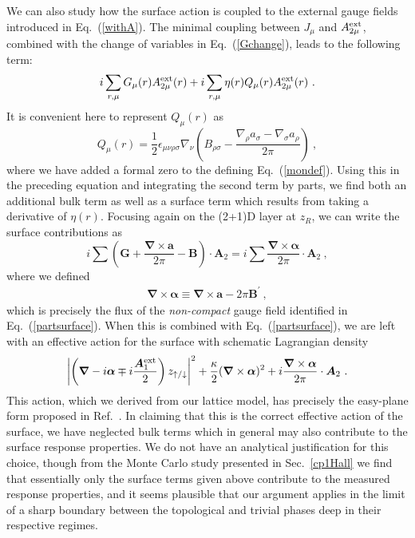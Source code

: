 We can also study how the surface action is coupled to the external gauge fields introduced in Eq.~(\ref{withA}). The minimal coupling between $J_\mu$ and $A^{\rm ext}_{2\mu}$, combined with the change of variables in Eq.~(\ref{Gchange}), leads to the following term:
\begin{equation}
i \sum_{r,\mu} G_\mu(r) A^{\rm ext}_{2\mu}(r) + i \sum_{r,\mu} \eta(r) Q_\mu(r) A^{\rm ext}_{2\mu}(r) ~.
\end{equation}
It is convenient here to represent $Q_\mu(r)$ as
\begin{equation}
Q_\mu(r) = \frac{1}{2} \epsilon_{\mu\nu\rho\sigma} \nabla_\nu 
\left(B_{\rho\sigma} - \frac{\nabla_\rho a_\sigma - \nabla_\sigma a_\rho}{2\pi} \right) ~,
\end{equation}
where we have added a formal zero to the defining Eq.~(\ref{mondef}).
Using this in the preceding equation and integrating the second term by parts, we find both an additional bulk term as well as a surface term which results from taking a derivative of $\eta(r)$. 
Focusing again on the (2+1)D layer at $z_R$, we can write the surface contributions as
\begin{equation}
i \sum \left({\bm G} + \frac{{\bm\nabla} \times {\bm a}}{2\pi} - {\bm B} \right) \cdot {\bm A}_2 = 
i \sum \frac{{\bm\nabla} \times {\bm \alpha}}{2\pi} \cdot {\bm A}_2 ~,
\label{surfaceCS} 
\end{equation}
where we defined
\begin{eqnarray}
{\bm\nabla} \times {\bm \alpha} \equiv {\bm\nabla} \times {\bm a} - 2\pi {\bm B}^\prime ~,
\end{eqnarray}
which is precisely the flux of the {\it non-compact} gauge field identified in Eq.~(\ref{partsurface}).
When this is combined with Eq.~(\ref{partsurface}), we are left with an effective action for the surface with schematic Lagrangian density
\begin{equation*}
\left|\left( {\bm \nabla} - i {\bm \alpha} \mp i\frac{{\bm A}^{\rm ext}_1}{2} \right) z_{\uparrow/\downarrow} \right|^2 + \frac{\kappa}{2} ({\bm \nabla} \times {\bm \alpha})^2 + i \frac{{\bm\nabla} \times {\bm \alpha}}{2\pi} \cdot {\bm A}_2 ~.
\end{equation*}
This action, which we derived from our lattice model, has precisely the easy-plane \nccp form proposed in Ref.~\cite{SenthilVishwanath}. In claiming that this is the correct effective action of the surface, we have neglected bulk terms which in general may also contribute to the surface response properties. We do not have an analytical justification for this choice, though from the Monte Carlo study presented in Sec.~\ref{cp1Hall} we find that essentially only the surface terms given above contribute to the measured response properties, and it seems plausible that our argument applies in the limit of a sharp boundary between the topological and trivial phases deep in their respective regimes.

